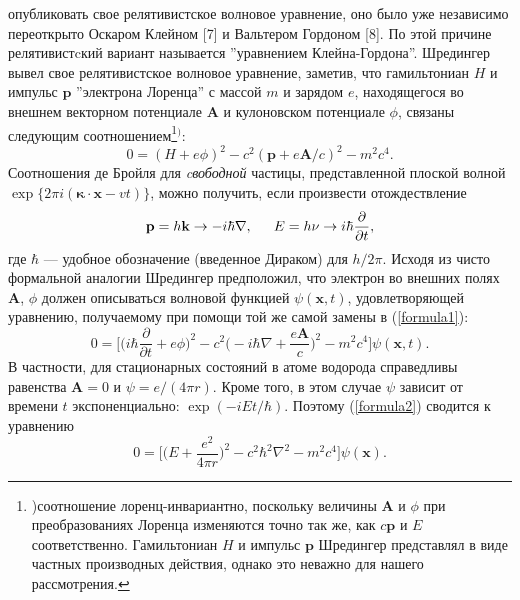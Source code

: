 \documentclass[a5paper,8pt]{article}
\begin{document}
\sloppy
\pagestyle{fancy}
\setlength{\abovedisplayskip}{6pt}
\setlength{\abovedisplayshortskip}{6pt}
\setlength{\belowdisplayskip}{6pt}
\setlength{\belowdisplayshortskip}{6pt}
\noindent
опубликовать свое релятивистское волновое уравнение, оно было уже независимо переоткрыто Оскаром Клейном [7] и Вальтером Гордоном [8]. По этой причине релятивистcкий вариант называется ''уравнением Клейна-Гордона''. \newline \indent Шредингер вывел свое релятивистское волновое уравнение, заметив, что гамильтониан $H$ и импульс $\textbf{p}$ ''электрона Лоренца'' с массой $m$ и зарядом $e$, находящегося во внешнем векторном потенциале $\textbf{A}$ и кулоновском потенциале $\phi$, связаны следующим соотношением\footnote{) соотношение лоренц-инвариантно, поскольку величины $\textbf{A}$ и $\phi$ при преобразованиях Лоренца изменяются точно так же, как $c\textbf{p}$ и $E$ соответственно. Гамильтониан $H$ и импульс $\textbf{p}$ Шредингер представлял в виде частных производных действия, однако это неважно для нашего рассмотрения.}$^)$:
\begin{equation}
\label{formula1}
0 = (H+e\phi )^2-c^2(\textbf{p} +e\textbf{A} /c)^2-m^2c^4.
\end{equation}
\noindent
Соотношения де Бройля для \textit{cвободной} частицы, представленной плоской волной $\exp\{2 \pi i(\boldsymbol{\kappa}\cdot\textbf{x}-vt)\} $, можно получить, если произвести отождествление
\begin{equation}
\textbf{p} = h\textbf{k}\rightarrow -i\hbar\nabla,\indent E=h\nu \rightarrow i\hbar \frac{\partial}{\partial t},
\end{equation}
\noindent
где $\hbar$ — удобное обозначение (введенное Дираком) для $h/2 \pi$. Исходя из чисто формальной аналогии Шредингер предположил, что электрон во внешних полях $\textbf{A}$, $\phi$ должен описываться волновой функцией $\psi(\textbf{x},t)$, удовлетворяющей уравнению, получаемому при помощи той же самой замены в (\ref{formula1}):
\begin{equation}
\label{formula2}
0 = \biggl[\biggl(i\hbar \frac{\partial}{\partial t}+e\phi \biggr)^2 - c^2\biggl(-i\hbar \nabla +\frac{e \textbf{A}}{c}\biggr)^2-m^2c^4\biggr]\psi (\textbf {x},t).
\end{equation}
В частности, для стационарных состояний в атоме водорода справедливы равенства $\textbf{A} = 0$ и $\psi = e/(4\pi r)$. Кроме того, в этом случае $\psi$ зависит от времени $t$ экспоненциально: $\exp(-iEt/\hbar)$. Поэтому (\ref{formula2}) сводится к уравнению
\begin{equation}
\label{formula3}
0 = \biggl[\biggl(E+\frac{e^2}{4\pi r}\biggr)^2-c^2\hbar^2\nabla^2-m^2c^4\biggr]\psi (\textbf{x}).
\end{equation}
\end{document}
